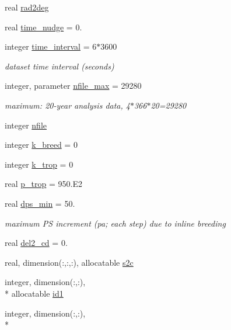 \begin{DoxyCompactItemize}
\item 
real \hyperlink{classfv__nwp__nudge__mod_a2b54722a648c7b5841e3a2138d55ac5f}{rad2deg}
\item 
real \hyperlink{classfv__nwp__nudge__mod_a2346c4b41d57e4f60a7029638bb5eef7}{time\-\_\-nudge} = 0.
\item 
integer \hyperlink{classfv__nwp__nudge__mod_a22a2c695dd1f7be9256ad520d57da7f6}{time\-\_\-interval} = 6$\ast$3600
\begin{DoxyCompactList}\small\item\em dataset time interval (seconds) \end{DoxyCompactList}\item 
integer, parameter \hyperlink{classfv__nwp__nudge__mod_a7fb7b0e5d02de9ce46ac54830d236d60}{nfile\-\_\-max} = 29280
\begin{DoxyCompactList}\small\item\em maximum\-: 20-\/year analysis data, 4$\ast$366$\ast$20=29280 \end{DoxyCompactList}\item 
integer \hyperlink{classfv__nwp__nudge__mod_ac3f13e9bca31d7209fb652c08f3f50b8}{nfile}
\item 
integer \hyperlink{classfv__nwp__nudge__mod_aaf51c10e6d30b78bfd85128c97461593}{k\-\_\-breed} = 0
\item 
integer \hyperlink{classfv__nwp__nudge__mod_adb928bbeb73152d230dd49e24124150b}{k\-\_\-trop} = 0
\item 
real \hyperlink{classfv__nwp__nudge__mod_aa5e41c5d5b93d1e265d8929674b87023}{p\-\_\-trop} = 950.E2
\item 
real \hyperlink{classfv__nwp__nudge__mod_a4af1c4f2d5d76d8cd9766c468a80ef59}{dps\-\_\-min} = 50.
\begin{DoxyCompactList}\small\item\em maximum P\-S increment (pa; each step) due to inline breeding \end{DoxyCompactList}\item 
real \hyperlink{classfv__nwp__nudge__mod_a973df199a4848c1b46ae42ab3423a68e}{del2\-\_\-cd} = 0.
\item 
real, dimension(\-:,\-:,\-:), allocatable \hyperlink{classfv__nwp__nudge__mod_a7d0277a732966ffab67f5853b8da70a5}{s2c}
\item 
integer, dimension(\-:,\-:), \\*
allocatable \hyperlink{classfv__nwp__nudge__mod_a355d223578b7728e289a6631c18206bb}{id1}
\item 
integer, dimension(\-:,\-:), \\*

\end{DoxyCompactItemize}
